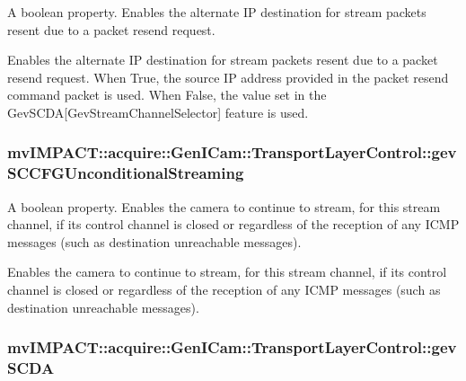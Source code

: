 A boolean property. Enables the alternate I\+P destination for stream packets resent due to a packet resend request. 

Enables the alternate I\+P destination for stream packets resent due to a packet resend request. When True, the source I\+P address provided in the packet resend command packet is used. When False, the value set in the Gev\+S\+C\+D\+A\mbox{[}Gev\+Stream\+Channel\+Selector\mbox{]} feature is used. \hypertarget{classmv_i_m_p_a_c_t_1_1acquire_1_1_gen_i_cam_1_1_transport_layer_control_a558802245c7a2b5de6e98fcb63be8e58}{
\subsubsection[{gev\+S\+C\+C\+F\+G\+Unconditional\+Streaming}]{ mv\+I\+M\+P\+A\+C\+T\+::acquire\+::\+Gen\+I\+Cam\+::\+Transport\+Layer\+Control\+::gev\+S\+C\+C\+F\+G\+Unconditional\+Streaming}}\label{classmv_i_m_p_a_c_t_1_1acquire_1_1_gen_i_cam_1_1_transport_layer_control_a558802245c7a2b5de6e98fcb63be8e58}


A boolean property. Enables the camera to continue to stream, for this stream channel, if its control channel is closed or regardless of the reception of any I\+C\+M\+P messages (such as destination unreachable messages). 

Enables the camera to continue to stream, for this stream channel, if its control channel is closed or regardless of the reception of any I\+C\+M\+P messages (such as destination unreachable messages). \hypertarget{classmv_i_m_p_a_c_t_1_1acquire_1_1_gen_i_cam_1_1_transport_layer_control_a06a3fafd41f32d5d6c1d84aeecee87ea}{
\subsubsection[{gev\+S\+C\+D\+A}]{ mv\+I\+M\+P\+A\+C\+T\+::acquire\+::\+Gen\+I\+Cam\+::\+Transport\+Layer\+Control\+::gev\+S\+C\+D\+A}}\label{classmv_i_m_p_a_c_t_1_1acquire_1_1_gen_i_cam_1_1_transport_layer_control_a06a3fafd41f32d5d6c1d84aeecee87ea}



